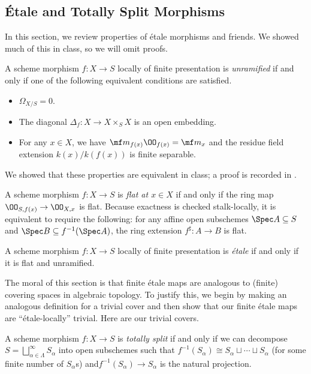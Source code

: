 \documentclass{amsart}
\begin{document}
\subsection{\'Etale and Totally Split Morphisms}
In this section, we review properties of \'etale morphisms and friends. We showed much of this in class, so we will omit proofs.
\begin{definition}[unramified]
    A scheme morphism $f\colon X\to S$ locally of finite presentation is \textit{unramified} if and only if one of the following equivalent conditions are satisfied.
    \begin{itemize}
        \item $\Omega_{X/S}=0$.
        \item The diagonal $\Delta_f\colon X\to X\times_SX$ is an open embedding.
        \item For any $x\in X$, we have $\mf m_{f(x)}\OO_{f(x)}=\mf m_x$ and the residue field extension $k(x)/k(f(x))$ is finite separable.
    \end{itemize}
\end{definition}
We showed that these properties are equivalent in class; a proof is recorded in \cite[\href{https://stacks.math.columbia.edu/tag/02GF}{Lemma 02GF}]{stacks}.
\begin{definition}[flat]
    A scheme morphism $f\colon X\to S$ is \textit{flat at $x\in X$} if and only if the ring map $\OO_{S,f(x)}\to\OO_{X,x}$ is flat. Because exactness is checked stalk-locally, it is equivalent to require the following: for any affine open subschemes $\Spec A\subseteq S$ and $\Spec B\subseteq f^{-1}(\Spec A)$, the ring extension $f^\sharp\colon A\to B$ is flat.
\end{definition}
\begin{definition}[\'etale]
    A scheme morphism $f\colon X\to S$ locally of finite presentation is \textit{\'etale} if and only if it is flat and unramified.
\end{definition}
The moral of this section is that finite \'etale maps are analogous to (finite) covering spaces in algebraic topology. To justify this, we begin by making an analogous definition for a trivial cover and then show that our finite \'etale maps are ``\'etale-locally'' trivial. Here are our trivial covers.
\begin{definition}
    A scheme morphism $f\colon X\to S$ is \textit{totally split} if and only if we can decompose $S=\bigsqcup_{\alpha\in\Lambda}^\infty S_\alpha$ into open subschemes such that $f^{-1}(S_\alpha)\cong S_\alpha\sqcup\cdots\sqcup S_\alpha$ (for some finite number of $S_\alpha$s) and$f^{-1}(S_\alpha)\to S_\alpha$ is the natural projection.
\end{definition}
\end{document}
